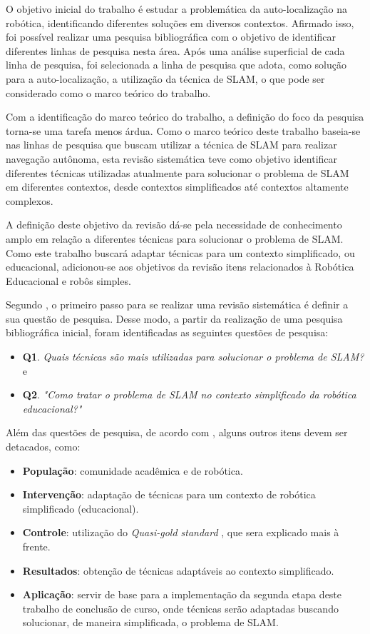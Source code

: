 		O objetivo inicial do trabalho é estudar a problemática da auto-localização na robótica, identificando diferentes soluções em diversos contextos. Afirmado isso, foi possível realizar uma pesquisa bibliográfica com o objetivo de identificar diferentes linhas de pesquisa nesta área. Após uma análise superficial de cada linha de pesquisa, foi selecionada a linha de pesquisa que adota, como solução para a auto-localização, a utilização da técnica de SLAM, o que pode ser considerado como o marco teórico do trabalho. 

		Com a identificação do marco teórico do trabalho, a definição do foco da pesquisa torna-se uma tarefa menos árdua. Como o marco teórico deste trabalho baseia-se nas linhas de pesquisa que buscam utilizar a técnica de SLAM para realizar navegação autônoma, esta revisão sistemática teve como objetivo identificar diferentes técnicas utilizadas atualmente para solucionar o problema de SLAM em diferentes contextos, desde contextos simplificados até contextos altamente complexos.

		A definição deste objetivo da revisão dá-se pela necessidade de conhecimento amplo em relação a diferentes técnicas para solucionar o problema de SLAM. Como este trabalho buscará adaptar técnicas para um contexto simplificado, ou educacional, adicionou-se aos objetivos da revisão itens relacionados à Robótica Educacional e robôs simples.

		Segundo \cite{Kitchenham}, o primeiro passo para se realizar uma revisão sistemática é definir a sua questão de pesquisa. Desse modo, a partir da realização de uma pesquisa bibliográfica inicial, foram identificadas as seguintes questões de pesquisa: 

		\begin{itemize}
			\item \textbf{Q1}. \textit{Quais técnicas são mais utilizadas para solucionar o problema de SLAM?} e
			\item \textbf{Q2}. \textit{"Como tratar o problema de SLAM no contexto simplificado da robótica educacional?"}
		\end{itemize}

		Além das questões de pesquisa, de acordo com \cite{exemploRevisaoSistematica}, alguns outros itens devem ser detacados, como:

		\begin{itemize}
			\item \textbf{População}: comunidade acadêmica e de robótica.
			\item \textbf{Intervenção}: adaptação de técnicas para um contexto de robótica simplificado (educacional).
			\item \textbf{Controle}: utilização do \textit{Quasi-gold standard} \cite{Kitchenham}, que sera explicado mais à frente.
			\item \textbf{Resultados}: obtenção de técnicas adaptáveis ao contexto simplificado.
			\item \textbf{Aplicação}: servir de base para a implementação da segunda etapa deste trabalho de conclusão de curso, onde técnicas serão adaptadas buscando solucionar, de maneira simplificada, o problema de SLAM.

		\end{itemize} 

